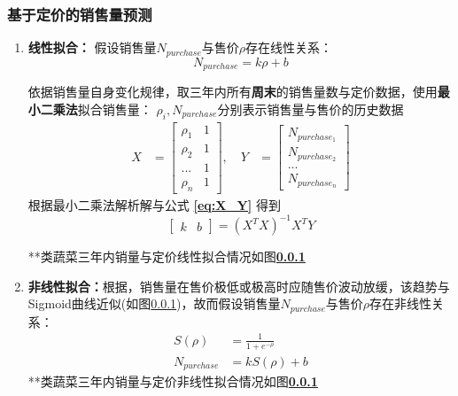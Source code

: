 \documentclass[withoutpreface,bwprint]{cumcmthesis} %
\begin{document}
\subsubsection{基于定价的销售量预测}
\begin{enumerate}
    \item \textbf{线性拟合：}
    假设销售量$N_{purchase}$与售价$\rho$存在线性关系：
    \begin{equation}
        N_{purchase} = k \rho + b 
    \label{eq:purchase_price}
    \end{equation}
    
    依据销售量自身变化规律，取三年内所有\textbf{周末}的销售量数与定价数据，使用\textbf{最小二乘法}拟合销售量：
    $\rho_i,N_{purchase}$分别表示销售量与售价的历史数据
\begin{equation}
\begin{aligned}
X &= \begin{bmatrix}
    \rho_1 & 1 \\
    \rho_2 & 1 \\
    ... & 1 \\
    \rho_n & 1 
\end{bmatrix} , \quad
Y &= \begin{bmatrix}
N_{purchase_1}\\
N_{purchase_2}\\
...\\
N_{purchase_n}
\end{bmatrix}
\end{aligned}
\label{eq:X_Y}
\end{equation}
 根据最小二乘法解析解\cite{min2*}与公式 \textbf{\ref{eq:X_Y}} 得到
\begin{equation}
\begin{bmatrix}
k&b
\end{bmatrix} 
=(X^TX)^{-1}X^TY 
    \label{eq:purchase_price}
    \end{equation}
    
    **类蔬菜三年内销量与定价线性拟合情况如图\textbf{\ref{}}


    
    \item \textbf{非线性拟合：}根据\cite{}，销售量在售价极低或极高时应随售价波动放缓，该趋势与Sigmoid曲线近似(如图\ref{})，故而假设销售量$N_{purchase}$与售价$\rho$存在非线性关系：
    \begin{equation}
    \begin{aligned}
        S(\rho) &= \frac{1}{1+e^{-\rho}}\\
        N_{purchase} &= kS({\rho}) + b
    \end{aligned}
    \end{equation}
     **类蔬菜三年内销量与定价非线性拟合情况如图\textbf{\ref{}}
\end{enumerate}
    
\end{document}

